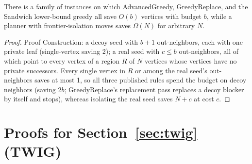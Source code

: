 \documentclass[ijoc,sglanonrev]{informs4}
\begin{document}
\begin{repeattheorem}
There is a family of instances on which AdvancedGreedy, GreedyReplace, and
the Sandwich lower-bound greedy all save $O(b)$ vertices with budget $b$,
while a planner with frontier-isolation moves saves $\Omega(N)$ for
arbitrary $N$.
\end{repeattheorem}
\begin{proof}{Proof}
Construction: a decoy seed with $b+1$ out-neighbors, each with one private
leaf (single-vertex saving 2); a real seed with $c\le b$ out-neighbors, all
of which point to every vertex of a region $R$ of $N$ vertices whose
vertices have no private successors. Every single vertex in $R$ or among
the real seed's out-neighbors saves at most 1, so all three published
rules spend the budget on decoy neighbors (saving $2b$; GreedyReplace's
replacement pass replaces a decoy blocker by itself and stops), whereas
isolating the real seed saves $N+c$ at cost $c$.\Halmos
\end{proof}

\section{Proofs for Section~\ref{sec:twig} (TWIG)}\label{ec:twig-proofs}
\end{document}
